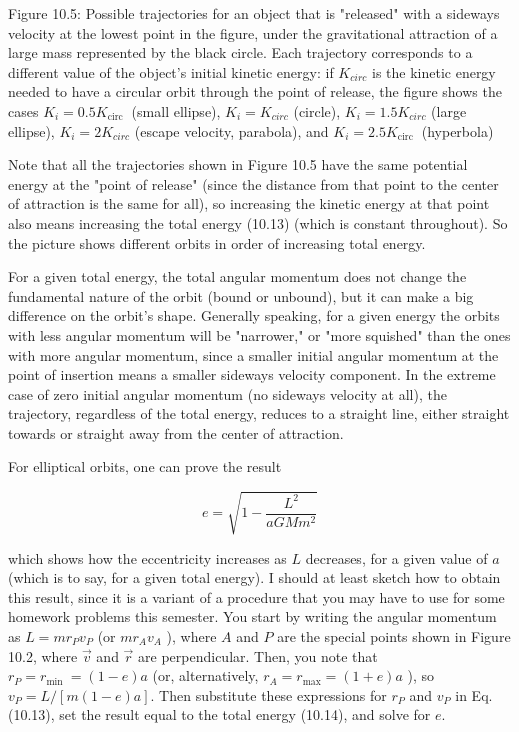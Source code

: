 \documentclass[10pt]{article}
\begin{document}
Figure 10.5: Possible trajectories for an object that is "released" with a sideways velocity at the lowest point in the figure, under the gravitational attraction of a large mass represented by the black circle. Each trajectory corresponds to a different value of the object's initial kinetic energy: if $K_{c i r c}$ is the kinetic energy needed to have a circular orbit through the point of release, the figure shows the cases $K_{i}=0.5 K_{\text {circ }}$ (small ellipse), $K_{i}=K_{c i r c}$ (circle), $K_{i}=1.5 K_{c i r c}$ (large ellipse), $K_{i}=2 K_{c i r c}$ (escape velocity, parabola), and $K_{i}=2.5 K_{\text {circ }}$ (hyperbola)

Note that all the trajectories shown in Figure 10.5 have the same potential energy at the "point of release" (since the distance from that point to the center of attraction is the same for all), so increasing the kinetic energy at that point also means increasing the total energy (10.13) (which is constant throughout). So the picture shows different orbits in order of increasing total energy.

For a given total energy, the total angular momentum does not change the fundamental nature of the orbit (bound or unbound), but it can make a big difference on the orbit's shape. Generally speaking, for a given energy the orbits with less angular momentum will be "narrower," or "more squished" than the ones with more angular momentum, since a smaller initial angular momentum at the point of insertion means a smaller sideways velocity component. In the extreme case of zero initial angular momentum (no sideways velocity at all), the trajectory, regardless of the total energy, reduces to a straight line, either straight towards or straight away from the center of attraction.

For elliptical orbits, one can prove the result


\begin{equation*}
e=\sqrt{1-\frac{L^{2}}{a G M m^{2}}} \tag{10.16}
\end{equation*}


which shows how the eccentricity increases as $L$ decreases, for a given value of $a$ (which is to say, for a given total energy). I should at least sketch how to obtain this result, since it is a variant of a procedure that you may have to use for some homework problems this semester. You start by writing the angular momentum as $L=m r_{P} v_{P}$ (or $m r_{A} v_{A}$ ), where $A$ and $P$ are the special points shown in Figure 10.2, where $\vec{v}$ and $\vec{r}$ are perpendicular. Then, you note that $r_{P}=r_{\text {min }}=(1-e) a$ (or, alternatively, $r_{A}=r_{\max }=(1+e) a$ ), so $v_{P}=L /[m(1-e) a]$. Then substitute these expressions for $r_{P}$ and $v_{P}$ in Eq. (10.13), set the result equal to the total energy (10.14), and solve for $e$.
\end{document}
